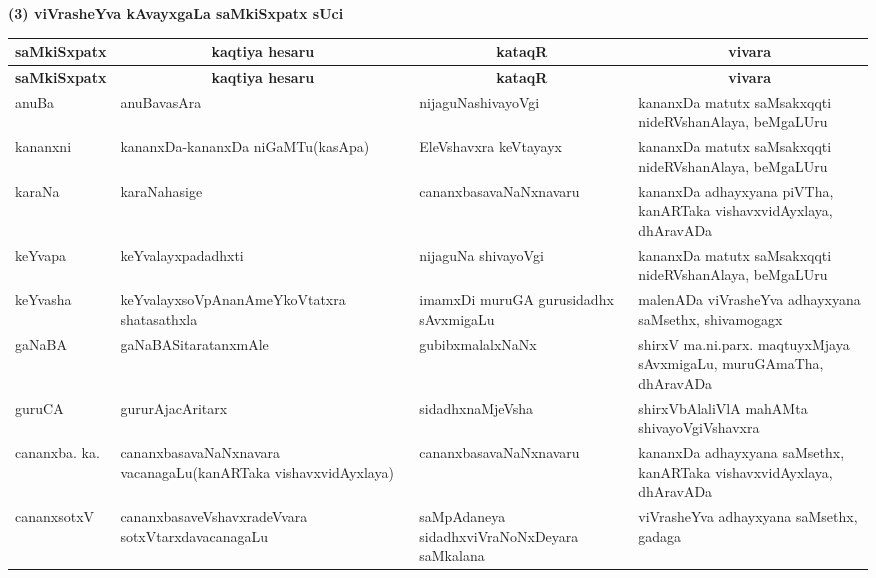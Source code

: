 \newpage

\begin{center}
{\large\bf (3) viVrasheYva kAvayxgaLa saMkiSxpatx sUci}
\end{center}


{\renewcommand{\arraystretch}{1.5}
\begin{longtable}{lp{4.2cm}p{4.2cm}<{\raggedright}p{4.2cm}<{\raggedright}@{}}
\hline
\multicolumn{1}{c}{\bf saMkiSxpatx} & \multicolumn{1}{c}{\bf kaqtiya hesaru} & \multicolumn{1}{c}{\bf kataqR} & \multicolumn{1}{c}{\bf vivara}\\[3pt]
\hline
\endfirsthead
\hline
\multicolumn{1}{c}{\bf saMkiSxpatx} & \multicolumn{1}{c}{\bf kaqtiya hesaru} & \multicolumn{1}{c}{\bf kataqR} & \multicolumn{1}{c}{\bf vivara}\\[3pt]
\hline
\endhead
\endfoot
\endlastfoot
anuBa & anuBavasAra &  nijaguNashivayoVgi & kananxDa matutx saMsakxqqti nideRVshanAlaya, beMgaLUru\\
kananxni & kananxDa-kananxDa niGaMTu\newline (kasApa) & EleVshavxra keVtayayx & kananxDa matutx saMsakxqqti nideRVshanAlaya, beMgaLUru\\
karaNa & karaNahasige & cananxbasavaNaNxnavaru & kananxDa adhayxyana piVTha, kanARTaka vishavxvidAyxlaya, dhAravADa\\
keYvapa & keYvalayxpadadhxti & nijaguNa shivayoVgi & kananxDa matutx saMsakxqqti nideRVshanAlaya, beMgaLUru\\
keYvasha & keYvalayxsoVpAnanAmeYkoVtatxra shatasathxla & imamxDi muruGA guru\-sidadhx sAvxmigaLu & malenADa viVrasheYva adhayxyana saMsethx, shivamogagx\\
gaNaBA & gaNaBASitaratanxmAle & gubibxmalalxNaNx & shirxV ma.ni.parx. maqtuyxMjaya sAvxmigaLu, muruGAmaTha, dhAravADa\\
guruCA & gururAjacAritarx & sidadhxnaMjeVsha & shirxVbAlaliVlA mahAMta shivayoVgiVshavxra\\
cananxba. ka. & cananxbasavaNaNxnavara vacanagaLu\newline (kanARTaka vishavxvidAyxlaya) & cananxbasavaNaNxnavaru & kananxDa adhayxyana saMsethx, kanARTaka vishavxvidAyxlaya, dhAravADa\\
cananxsotxV & cananxbasaveVshavxradeVvara sotxVtarxda\newline vacanagaLu & saMpAdaneya sidadhxviVraNoNxDeyara saMkalana & viVrasheYva adhayxyana saMsethx, gadaga\\

\end{longtable}}
